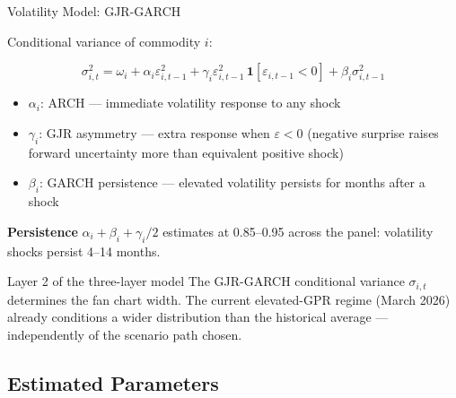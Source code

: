 ﻿\documentclass[aspectratio=1610]{beamer}
\begin{document}
\begin{frame}[shrink=10]{Volatility Model: GJR-GARCH}

  Conditional variance of commodity $i$:

  \[
    \sigma_{i,t}^2 = \omega_i
      + \alpha_i \varepsilon_{i,t-1}^2
      + \gamma_i \varepsilon_{i,t-1}^2\,\mathbf{1}[\varepsilon_{i,t-1} < 0]
      + \beta_i \sigma_{i,t-1}^2
  \]

  \begin{itemize}
    \item $\alpha_i$: ARCH --- immediate volatility response to any shock
    \item $\gamma_i$: GJR asymmetry --- extra response when $\varepsilon < 0$
          (negative surprise raises forward uncertainty more than equivalent
          positive shock)
    \item $\beta_i$: GARCH persistence --- elevated volatility persists for
          months after a shock
  \end{itemize}

  \textbf{Persistence} $\alpha_i + \beta_i + \gamma_i/2$ estimates at
  0.85--0.95 across the panel: volatility shocks persist 4--14 months.

  \begin{alertblock}{Layer 2 of the three-layer model}
    The GJR-GARCH conditional variance $\sigma_{i,t}$ determines the fan chart
    width. The current elevated-GPR regime (March 2026) already conditions a
    wider distribution than the historical average --- independently of the
    scenario path chosen.
  \end{alertblock}

\end{frame}

\subsection{Estimated Parameters}
\end{document}

